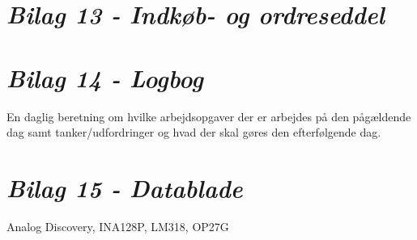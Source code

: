 \section*{\textit{Bilag 13 - Indkøb- og ordreseddel}} \label{bilag13}
\section*{\textit{Bilag 14 - Logbog}} \label{bilag14}
En daglig beretning om hvilke arbejdsopgaver der er arbejdes på den pågældende dag samt tanker/udfordringer og hvad der skal gøres den efterfølgende dag.
\section*{\textit{Bilag 15 - Datablade}} \label{bilag15}
Analog Discovery, INA128P, LM318, OP27G



